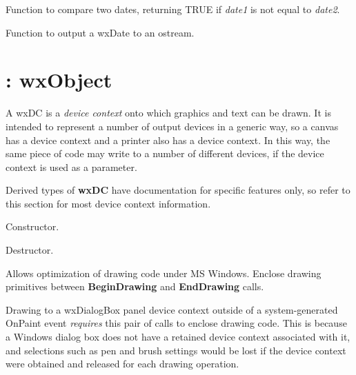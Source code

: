 

Function to compare two dates, returning TRUE if {\it date1} is not equal to {\it date2}.



Function to output a wxDate to an ostream.

\section{: wxObject}\label{wxdc}


A wxDC is a {\it device context} onto which graphics and text can be drawn.
It is intended to represent a number of output devices in a generic way,
so a canvas has a device context and a printer also has a device context.
In this way, the same piece of code may write to a number of different devices,
if the device context is used as a parameter.

Derived types of {\bf wxDC} have documentation for specific features
only, so refer to this section for most device context information.



Constructor.



Destructor.



Allows optimization of drawing code under MS Windows. Enclose
drawing primitives between {\bf BeginDrawing} and {\bf EndDrawing}\rtfsp
calls.

Drawing to a wxDialogBox panel device context outside of a
system-generated OnPaint event {\it requires} this pair of calls to
enclose drawing code. This is because a Windows dialog box does not have
a retained device context associated with it, and selections such as pen
and brush settings would be lost if the device context were obtained and
released for each drawing operation.

